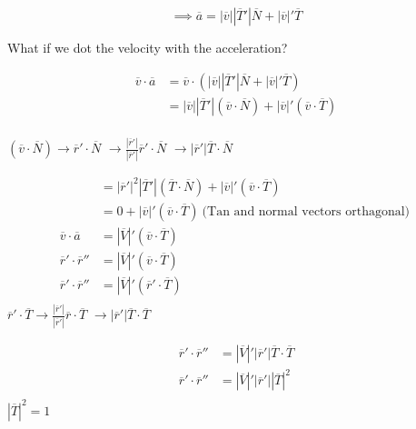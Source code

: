 \[\implies \overline{a} = \left| \overline{v} \right| \left| \overline{T}' \right| \overline{N} + \left| \overline{v} \right| ' \overline{T}\]

What if we dot the velocity with the acceleration?

\begin{align*}
\overline{v} \cdot \overline{a} &=  \overline{v} \cdot \left( \left| \overline{v} \right| \left| \overline{T}' \right| \overline{N} + \left| \overline{v} \right| ' \overline{T} \right) \\
&= \left| \overline{v} \right|
\left| \overline{T}' \right|
\left( \overline{v} \cdot \overline{N} \right)
+ \left| \overline{v} \right| '
\left( \overline{v} \cdot \overline{T} \right)\\
\end{align*}

$\left( \overline{v} \cdot \overline{N} \right) \to \overline{r}' \cdot \overline{N}$
$\to \frac{\left| \overline{r}' \right| }{\left| \overline{r}' \right| } \overline{r}' \cdot \overline{N}$
$\to \left| \overline{r}' \right| \overline{T} \cdot \overline{N}$

\begin{align*}
	&= \left| \overline{r}' \right|^2 \left| \overline{T}' \right| \left( \overline{T} \cdot \overline{N} \right)
+ \left| \overline{v} \right| '
\left( \overline{v} \cdot \overline{T} \right)\\
	&= 0 + \left| \overline{v} \right| ' \left( \overline{v} \cdot \overline{T} \right)\:\text{(Tan and normal vectors orthagonal)}\: \\
\overline{v} \cdot \overline{a}	&= \left| \overline{V} \right| ' \left( \overline{v} \cdot \overline{T} \right)  \\
	\overline{r}' \cdot \overline{r}''&= \left| \overline{V} \right| ' \left( \overline{v} \cdot \overline{T} \right)  \\
	\overline{r}' \cdot \overline{r}''&= \left| \overline{V} \right| ' \left( \overline{r}' \cdot \overline{T} \right)  \\
\end{align*}
$\overline{r}' \cdot \overline{T} \to \frac{\left| \overline{r}' \right| }{\left| \overline{r}' \right| } \overline{r} \cdot \overline{T}$
$\to \left| \overline{r}' \right| \overline{T} \cdot \overline{T}$

\begin{align*}
	\overline{r}' \cdot \overline{r}''&= \left| \overline{V} \right| '  \left|   \overline{r}' \right|\overline{T} \cdot \overline{T}  \\
	\overline{r}' \cdot \overline{r}''&= \left| \overline{V} \right| ' \left|   \overline{r}' \right| \left| \overline{T} \right|^2 \\
\end{align*}
$\left| \overline{T} \right|^2 = 1$

